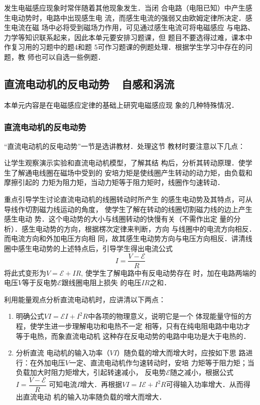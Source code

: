 发生电磁感应现象时常伴随着其他现象发生．当闭
合电路（电阻已知）中产生感生电动势时，电路中出现感生电
流，而感生电流的强弱又由欧姆定律所决定．感生电流在磁
场中必将受到磁场力作用，可见通过感生电流可将电磁感应
与电路、力学等知识联系起来，因此本单元要安排习题课，但
题目不要选得过难，课本中作复习用的习题中的题4和题
5可作习题课的例题处理．根据学生学习中存在的问题，教
师也可以自选一些例题．

\subsection{直流电动机的反电动势~~自感和涡流}
本单元内容是在电磁感应定律的基础上研究电磁感应现
象的几种特殊情况．

\subsubsection{直流电动机的反电动势}
“直流电动机的反电动势”一节是选讲教材．处理这节
教材时要注意以下几点：

让学生观察演示实验和直流电动机模型，了解其结
构后，分析其转动原理．使学生了解通电线圈在磁场中受到的
安培力矩是使线圈产生转动的动力矩，由负载和摩擦引起的
力矩为阻力矩，当动力矩等于阻力矩时，线圈作匀速转动．

重点引导学生讨论直流电动机的线圈转动时所产生
的感生电动势及其特点，可从导线作切割磁力线运动的角度，
使学生了解在转动的线圈切割磁力线的边上产生感生电动
势．这个电动势的大小与线圈转动的快慢有关（不需作出定
量的分析）．感生电动势的方向，根据楞次定律来判断，方向
与线圈中的电流方向相反．而电流方向和外加电压方向相
同，故其感生电动势方向与电压方向相反．讲清线圈中感生电动势的上述特点后，引导学生得出电流公式
\[I=\frac{V-\mathcal{E}}{R}\]
将此式变形为$V=\mathcal{E}+IR$, 使学生了解电路中有反电动势存在
时，加在电路两端的电压$V$等于反电势$\mathcal{E}$跟线圈电阻上损失
的电压$IR$之和．

利用能量观点分析直流电动机时，应讲清以下两点：
\begin{enumerate}
    \item 明确公式$VI=\mathcal{E}I+I^2R$中各项的物理意义，说明它是一个
体现能量守恒的方程，使学生进一步理解电功和电热不一定
相等，只有在纯电阻电路中电功才等于电热，而象直流电动机
这种存在反电动势的电路中电功是大于电热的．
\item 分析直流
电动机的输入功率（$VI$）随负载的增大而增大时，应按如下思
路进行：在外加电压$V$一定、直流电动机作匀速转动时，安培
力矩等于阻力矩；当负载加大时阻力矩增大，引起转速减小，
反电势$\mathcal{E}$随之减小，根据公式$I=\dfrac{V-\mathcal{E}}{R}$
可知电流$I$增大．再根据$VI=I\mathcal{E}+I^2R$可得输入功率增大．从而得出直流电动
机的输入功率随负载的增大而增大．
\end{enumerate}

